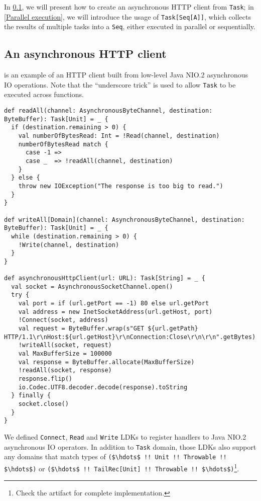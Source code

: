 In \cref{An asynchronous HTTP client}, we will present how to create an asynchronous HTTP client from \lstinline{Task}; in \cref{Parallel execution}, we will introduce the usage of \lstinline{Task[Seq[A]]}, which collects the results of multiple tasks into a \lstinline{Seq}, either executed in parallel or sequentially.

\subsection{An asynchronous HTTP client}\label{An asynchronous HTTP client}

 is an example of an HTTP client built from low-level Java NIO.2 asynchronous IO operations. Note that the ``underscore trick'' is used to allow \lstinline{Task} to be executed across functions.

\begin{lstlisting}[caption={An asynchronous HTTP client},label={httpClient}]
def readAll(channel: AsynchronousByteChannel, destination: ByteBuffer): Task[Unit] = _ {
  if (destination.remaining > 0) {
    val numberOfBytesRead: Int = !Read(channel, destination)
    numberOfBytesRead match {
      case -1 =>
      case _  => !readAll(channel, destination)
    }
  } else {
    throw new IOException("The response is too big to read.")
  }
}

def writeAll[Domain](channel: AsynchronousByteChannel, destination: ByteBuffer): Task[Unit] = _ {
  while (destination.remaining > 0) {
    !Write(channel, destination)
  }
}

def asynchronousHttpClient(url: URL): Task[String] = _ {
  val socket = AsynchronousSocketChannel.open()
  try {
    val port = if (url.getPort == -1) 80 else url.getPort
    val address = new InetSocketAddress(url.getHost, port)
    !Connect(socket, address)
    val request = ByteBuffer.wrap(s"GET ${url.getPath} HTTP/1.1\r\nHost:${url.getHost}\r\nConnection:Close\r\n\r\n".getBytes)
    !writeAll(socket, request)
    val MaxBufferSize = 100000
    val response = ByteBuffer.allocate(MaxBufferSize)
    !readAll(socket, response)
    response.flip()
    io.Codec.UTF8.decoder.decode(response).toString
  } finally {
    socket.close()
  }
}
\end{lstlisting}

We defined \lstinline{Connect}, \lstinline{Read} and \lstinline{Write} LDKs to register handlers to Java NIO.2 asynchronous IO operators. In addition to \lstinline{Task} domain, those LDKs also support any domains that match types of \lstinline[mathescape=true]{($\hdots$ !! Unit !! Throwable !! $\hdots$)} or \lstinline[mathescape=true]{($\hdots$ !! TailRec[Unit] !! Throwable !! $\hdots$)}\footnote{Check the artifact for complete implementation.}.

